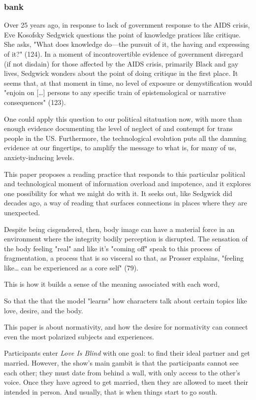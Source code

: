 \documentclass[11pt]{article}
\begin{document}
\subsubsection{bank}
\label{sec:orgcb4393f}
Over 25 years ago, in response to lack of government response to the
AIDS crisis, Eve Kosofsky Sedgwick questions the point of knowledge
pratices like critique. She asks, "What does knowledge do---the
pursuit of it, the having and expressing of it?" (124). In a moment of
incontrovertible evidence of government disregard (if not disdain) for
those affected by the AIDS crisis, primarily Black and gay lives,
Sedgwick wonders about the point of doing critique in the first place.
It seems that, at that moment in time, no level of exposure or
demystification would "enjoin on [\ldots{}] persons to any specific train
of epistemological or narrative consequences" (123).

One could apply this question to our political sitatuation now, with
more than enough evidence documenting the level of neglect of and
contempt for trans people in the US. Furthermore, the technological
evolution puts all the damning evidence at our fingertips, to amplify
the message to what is, for many of us, anxiety-inducing levels.

This paper proposes a reading practice that responds to this
particular political and technological moment of information overload
and impotence, and it explores one possibility for what we might do
with it. It seeks out, like Sedgwick did decades ago, a way of reading
that surfaces connections in places where they are unexpected.

Despite being cisgendered, then, body image can have a material force
in an environment where the integrity bodily perception is disrupted.
The sensation of the body feeling "real" and like it's "coming off"
speak to this process of fragmentation, a process that is so visceral
so that, as Prosser explains, "feeling like\ldots{} can be experienced as a
core self" (79).

This is how it builds a sense of the meaning associated with each
word,

So that the that the model "learns" how characters talk about certain
topics like love, desire, and the body.

This paper is about normativity, and how the desire for normativity
can connect even the most polarized subjects and experiences.

Participants enter \emph{Love Is Blind} with one goal: to find their ideal
partner and get married. However, the show's main gambit is that the
participants cannot see each other; they must date from behind a wall,
with only access to the other's voice. Once they have agreed to get
married, then they are allowed to meet their intended in person. And
usually, that is when things start to go south.
\end{document}
